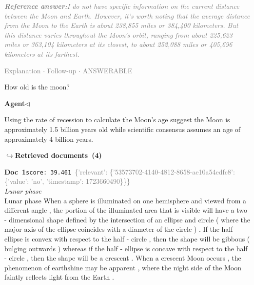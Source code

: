 \documentclass[a4paper,11pt]{article}
\begin{document}
\begin{refanswerenv}
{\footnotesize\textit{\textcolor{gray}{\textbf{Reference answer:}\enspace I do not have specific information on the current distance between the Moon and Earth. However, it's worth noting that the average distance from the Moon to the Earth is about 238,855 miles or 384,400 kilometers. But this distance varies throughout the Moon's orbit, ranging from about 225,623 miles or 363,104 kilometers at its closest, to about 252,088 miles or 405,696 kilometers at its farthest.}}}
\end{refanswerenv}
\vspace{0.5em}
\hfill{\tiny\textcolor{gray}{Explanation $\cdot$ Follow-up $\cdot$ ANSWERABLE}}
\begin{userbubble}
How old is the moon?
\end{userbubble}
\noindent\hfill{\small\textcolor{agentcolor}{\textbf{Agent\enspace$\triangleleft$}}}
\begin{agentbubble}
Using the rate of recession to calculate the Moon's age suggest the Moon is approximately 1.5 billion years old while scientific consensus assumes an age of approximately 4 billion years. 
\end{agentbubble}
\noindent\hfill{\footnotesize\textcolor{doccolor}{\textbf{$\hookrightarrow$\enspace Retrieved documents~(4)}}}
\begin{docenv}
{\footnotesize\textcolor{doccolor}{\textbf{Doc~1}}}\hfill{\tiny\texttt{score:~39.461}}\ {\tiny\textcolor{gray}{\{'relevant': \{'53573702-4140-4812-8658-ae10a54edfc8': \{'value': 'no', 'timestamp': 1723660490\}\}\}}}\\[3pt]
{\small\textit{Lunar phase}}\\[2pt]
\vspace{2pt}
{\footnotesize Lunar phase
When a sphere is illuminated on one hemisphere and viewed from a different angle , the portion of the illuminated area that is visible will have a two - dimensional shape defined by the intersection of an ellipse and circle ( where the major axis of the ellipse coincides with a diameter of the circle ) . If the half - ellipse is convex with respect to the half - circle , then the shape will be gibbous ( bulging outwards ) whereas if the half - ellipse is concave with respect to the half - circle , then the shape will be a crescent . When a crescent Moon occurs , the phenomenon of earthshine may be apparent , where the night side of the Moon faintly reflects light from the Earth .}
\end{docenv}
\end{document}
